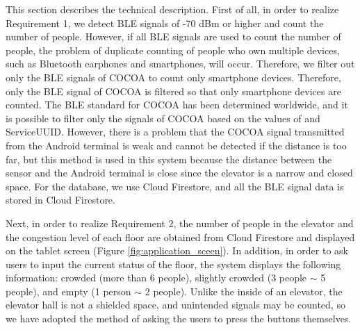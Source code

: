 This section describes the technical description. First of all, in order to realize Requirement 1, we detect BLE signals of -70 dBm or higher and count the number of people. However, if all BLE signals are used to count the number of people, the problem of duplicate counting of people who own multiple devices, such as Bluetooth earphones and smartphones, will occur. Therefore, we filter out only the BLE signals of COCOA to count only smartphone devices. Therefore, only the BLE signal of COCOA is filtered so that only smartphone devices are counted. The BLE standard for COCOA has been determined worldwide, and it is possible to filter only the signals of COCOA based on the values of \cite{cocoa_ble} and ServiceUUID. However, there is a problem that the COCOA signal transmitted from the Android terminal is weak and cannot be detected if the distance is too far, but this method is used in this system because the distance between the sensor and the Android terminal is close since the elevator is a narrow and closed space. For the database, we use Cloud Firestore, and all the BLE signal data is stored in Cloud Firestore.

Next, in order to realize Requirement 2, the number of people in the elevator and the congestion level of each floor are obtained from Cloud Firestore and displayed on the tablet screen (Figure \ref{fig:application_sceen}). In addition, in order to ask users to input the current status of the floor, the system displays the following information: crowded (more than 6 people), slightly crowded (3 people $\sim$ 5 people), and empty (1 person $\sim$ 2 people). Unlike the inside of an elevator, the elevator hall is not a shielded space, and unintended signals may be counted, so we have adopted the method of asking the users to press the buttons themselves.
